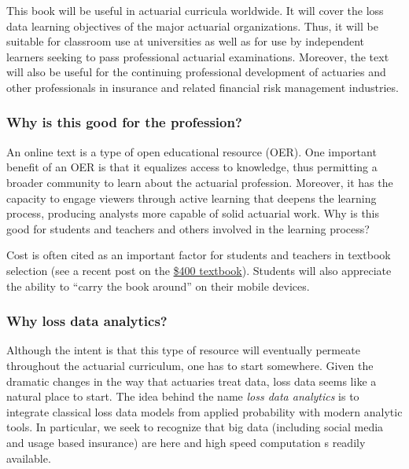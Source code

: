\documentclass[]{book}
\theoremstyle{definition}
\theoremstyle{definition}
\theoremstyle{definition}
\theoremstyle{remark}
\begin{document}
This book will be useful in actuarial curricula worldwide. It will cover
the loss data learning objectives of the major actuarial organizations.
Thus, it will be suitable for classroom use at universities as well as
for use by independent learners seeking to pass professional actuarial
examinations. Moreover, the text will also be useful for the continuing
professional development of actuaries and other professionals in
insurance and related financial risk management industries.

\subsubsection*{Why is this good for the
profession?}\label{why-is-this-good-for-the-profession}

An online text is a type of open educational resource (OER). One
important benefit of an OER is that it equalizes access to knowledge,
thus permitting a broader community to learn about the actuarial
profession. Moreover, it has the capacity to engage viewers through
active learning that deepens the learning process, producing analysts
more capable of solid actuarial work. Why is this good for students and
teachers and others involved in the learning process?

Cost is often cited as an important factor for students and teachers in
textbook selection (see a recent post on the
\href{https://www.aei.org/publication/the-new-era-of-the-400-college-textbook-which-is-part-of-the-unsustainable-higher-education-bubble/}{\$400
textbook}). Students will also appreciate the ability to ``carry the
book around'' on their mobile devices.

\subsubsection*{Why loss data analytics?}\label{why-loss-data-analytics}

Although the intent is that this type of resource will eventually
permeate throughout the actuarial curriculum, one has to start
somewhere. Given the dramatic changes in the way that actuaries treat
data, loss data seems like a natural place to start. The idea behind the
name \emph{loss data analytics} is to integrate classical loss data
models from applied probability with modern analytic tools. In
particular, we seek to recognize that big data (including social media
and usage based insurance) are here and high speed computation s readily
available.
\end{document}
